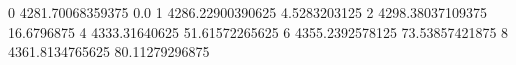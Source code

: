 0 4281.70068359375 0.0
1 4286.22900390625 4.5283203125
2 4298.38037109375 16.6796875
4 4333.31640625 51.61572265625
6 4355.2392578125 73.53857421875
8 4361.8134765625 80.11279296875
